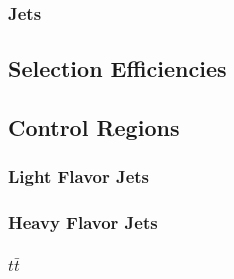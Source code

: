 \subsubsection{Jets}

\subsection{Selection Efficiencies}

\subsection{Control Regions}

\subsubsection{Light Flavor Jets}

\subsubsection{Heavy Flavor Jets}

\subsubsection{$t\bar{t}$}
